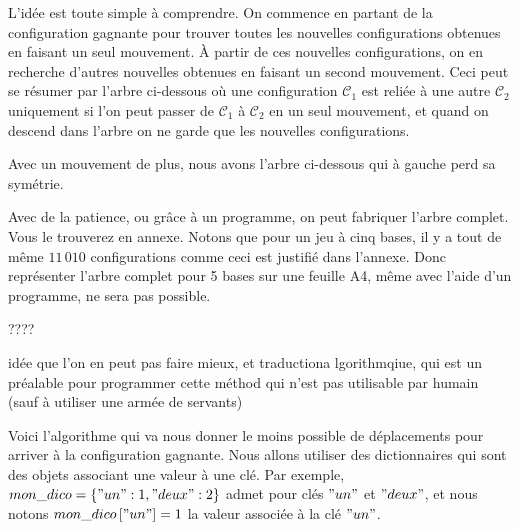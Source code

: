 L'idée est toute simple à comprendre. On commence en partant de la configuration gagnante pour trouver toutes les nouvelles configurations obtenues en faisant un seul mouvement.
À partir de ces nouvelles configurations, on en recherche d'autres nouvelles obtenues en faisant un second mouvement. Ceci peut se résumer par l'arbre ci-dessous où une configuration $\mathcal{C}_1$ est reliée à une autre $\mathcal{C}_2$ uniquement si l'on peut passer de $\mathcal{C}_1$ à $\mathcal{C}_2$ en un seul mouvement, et quand on descend dans l'arbre on ne garde que les nouvelles configurations.




Avec un mouvement de plus, nous avons l'arbre ci-dessous qui à gauche perd sa symétrie.




Avec de la patience, ou grâce à un programme, on peut fabriquer l'arbre complet. Vous le trouverez en annexe. Notons que pour un jeu à cinq bases, il y a tout de même $11\,010$ configurations comme ceci est justifié dans l'annexe. Donc représenter l'arbre complet pour 5 bases sur une feuille A4, même avec l'aide d'un programme, ne sera pas possible. 


\medskip

????

idée que l'on en peut pas faire mieux, et traductiona lgorithmqiue, qui est un préalable pour programmer cette méthod qui n'est pas utilisable par humain (sauf à utiliser une armée de servants)


Voici l'algorithme qui va nous donner le moins possible de déplacements pour arriver à la configuration gagnante. Nous allons utiliser des dictionnaires qui sont des objets associant une valeur à une clé. Par exemple, $mon\_dico = \{"un": 1, "deux":2 \}$ admet pour clés $"un"$ et $"deux"$, et nous notons $mon\_dico\left["un"\right] = 1$ la valeur associée à la clé $"un"$.

\bigskip

\begin{algo}
	\vspace{0.4em}
\end{algo}


